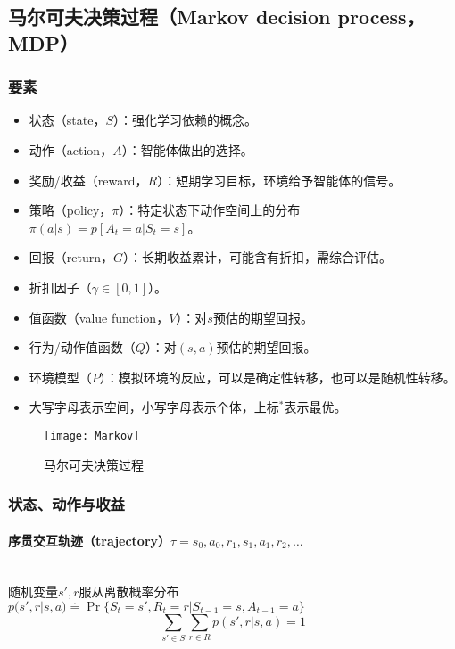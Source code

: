 \documentclass[
12pt, %
a4paper, 
oneside, %
headinclude,footinclude, %
]{scrartcl}
\begin{document}
\subsection[马尔可夫决策过程]{马尔可夫决策过程（Markov decision process，MDP）}
\subsubsection[要素]{要素}
\begin{itemize}
\item 状态（state，$ S $）：强化学习依赖的概念。
\item 动作（action，$ A $）：智能体做出的选择。
\item 奖励/收益（reward，$ R $）：短期学习目标，环境给予智能体的信号。
\item 策略（policy，$ \pi $）：特定状态下动作空间上的分布$ \pi(a|s) = p[A_t = a|S_t = s] $。
\item 回报（return，$ G $）：长期收益累计，可能含有折扣，需综合评估。
\item 折扣因子（$ \gamma \in [0, 1] $）。
\item 值函数（value function，$ V $）：对$ s $预估的期望回报。
\item 行为/动作值函数（$ Q $）：对$ (s, a) $预估的期望回报。
\item 环境模型（$ P $）：模拟环境的反应，可以是确定性转移，也可以是随机性转移。
\item 大写字母表示空间，小写字母表示个体，上标$ ^* $表示最优。
\end{itemize}

\begin{figure}[H]
\centering 
\texttt{[image: Markov]} 
\caption{马尔可夫决策过程}
\end{figure}
\subsubsection[状态、动作与收益]{状态、动作与收益}
\paragraph{序贯交互轨迹（trajectory）$ \tau =  s_0, a_0, r_1, s_1, a_1, r_2, \dots $}~\\

随机变量$ s', r $服从离散概率分布$ p(s', r|s, a) \doteq \Pr\{S_t = s', R_t = r|S_{t - 1} = s, A_{t - 1} = a\} $
$$ \sum_{s' \in S}\sum_{r \in R} p(s', r|s, a) = 1 $$
\end{document}
